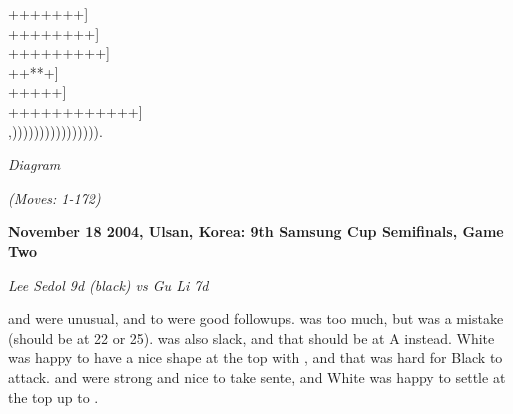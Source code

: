 \documentclass[letterpaper,12pt]{memoir}
\newcounter{GoFigure}[part]
\newcommand{\gofigure}{%
 \stepcounter{GoFigure}
 \centerline{\textit{Diagram \arabic{GoFigure}}}
}
\newcommand{\subtext}[1]{\centerline{\textit{#1}}}
\begin{document}
{{++++{\gnoswi{}}{\gnosbi{}}{\gnosbi{}}{\gnoswi{}}+{\gnoswi{}}{\gnoswi{}}{\gnoswi{}}++]\\
+++{\gnosbi{}}{\gnosbi{}}{\gnoswi{}}{\gnoswi{}}{\gnosbi{}}++++{\gnosbi{}}+]\\
{\gnosbi{}}{\gnoswi{}}{\gnoswi{}}++++{\gnosbi{}}{\gnoswi{}}++{\gnosbi{}}{\gnosbi{}}++{\gnoswi{}}{\gnosbi{}}+]\\
++{\gnoswi{}}{\gnoswi{}}*{\gnoswi{}}{\gnoswi{}}{\gnosbi{}}{\gnosbi{}}{\gnoswi{}}*{\gnosbi{}}+]\\
++{\gnosbi{}}+{\gnoswi{}}{\gnosbi{}}{\gnoswi{}}{\gnosbi{}}{\gnoswi{}}++]\\
+++++++++{\gnoswi{}}{\gnosbi{}}{\gnoswi{}}{\gnosbi{}}{\gnosbi{}}+++]\\
,)))))))))){\gnoswi{}})))))).\\
}
}
\gofigure
\subtext{(Moves: 1-172)}

\textbf{November 18 2004, Ulsan, Korea: 9th Samsung Cup Semifinals, Game Two}

\textit{Lee Sedol 9d (black) vs Gu Li 7d}

{} and {} were unusual, and {} to {} were good followups.
{} was too much, but {} was a mistake (should be at 22 or 25).
 {} was also slack, and that should be at A instead.
White was happy to have a nice shape at the top with {}, and that was hard for Black to attack.
{} and {} were strong and nice to take sente, and White was happy to settle at the top up to {}.
\end{document}
